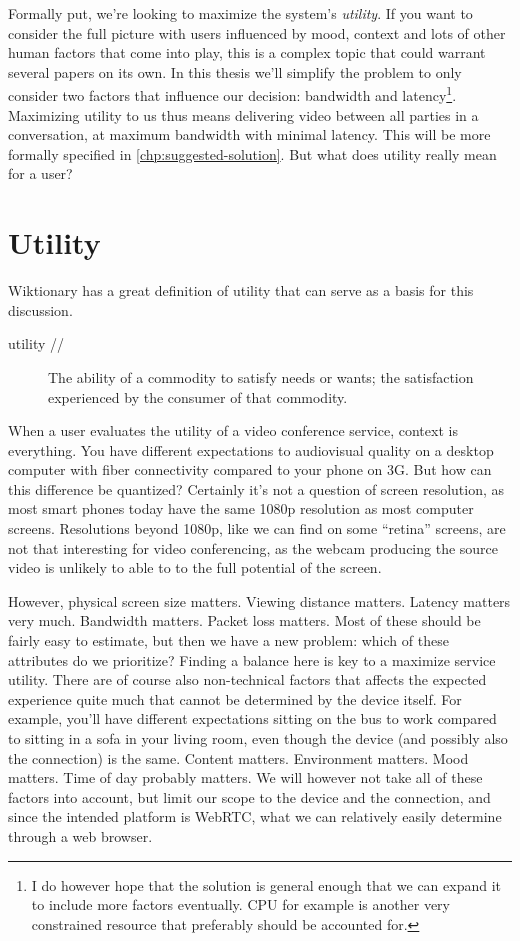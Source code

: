 Formally put, we're looking to maximize the system's \emph{utility}. If you want to consider the full picture with users influenced by mood, context and lots of other human factors that come into play, this is a complex topic that could warrant several papers on its own. In this thesis we'll simplify the problem to only consider two factors that influence our decision: bandwidth and latency\footnote{I do however hope that the solution is general enough that we can expand it to include more factors eventually. CPU for example is another very constrained resource that preferably should be accounted for.}. Maximizing utility to us thus means delivering video between all parties in a conversation, at maximum bandwidth with minimal latency. This will be more formally specified in \autoref{chp:suggested-solution}. But what does utility really mean for a user?


\section{Utility}

Wiktionary \cite{wiki-utility} has a great definition of utility that can serve as a basis for this discussion.

\begin{description}
    \item[utility //]  The ability of a commodity to satisfy needs or wants; the satisfaction experienced by the consumer of that commodity.
\end{description}

When a user evaluates the utility of a video conference service, context is everything. You have different expectations to audiovisual quality on a desktop computer with fiber connectivity compared to your phone on 3G. But how can this difference be quantized? Certainly it's not a question of screen resolution, as most smart phones today have the same 1080p resolution as most computer screens. Resolutions beyond 1080p, like we can find on some ``retina'' screens, are not that interesting for video conferencing, as the webcam producing the source video is unlikely to able to to the full potential of the screen.

However, physical screen size matters. Viewing distance matters. Latency matters very much. Bandwidth matters. Packet loss matters. Most of these should be fairly easy to estimate, but then we have a new problem: which of these attributes do we prioritize? Finding a balance here is key to a maximize service utility. There are of course also non-technical factors that affects the expected experience quite much that cannot be determined by the device itself. For example, you'll have different expectations sitting on the bus to work compared to sitting in a sofa in your living room, even though the device (and possibly also the connection) is the same. Content matters. Environment matters. Mood matters. Time of day probably matters. We will however not take all of these factors into account, but limit our scope to the device and the connection, and since the intended platform is WebRTC, what we can relatively easily determine through a web browser.

